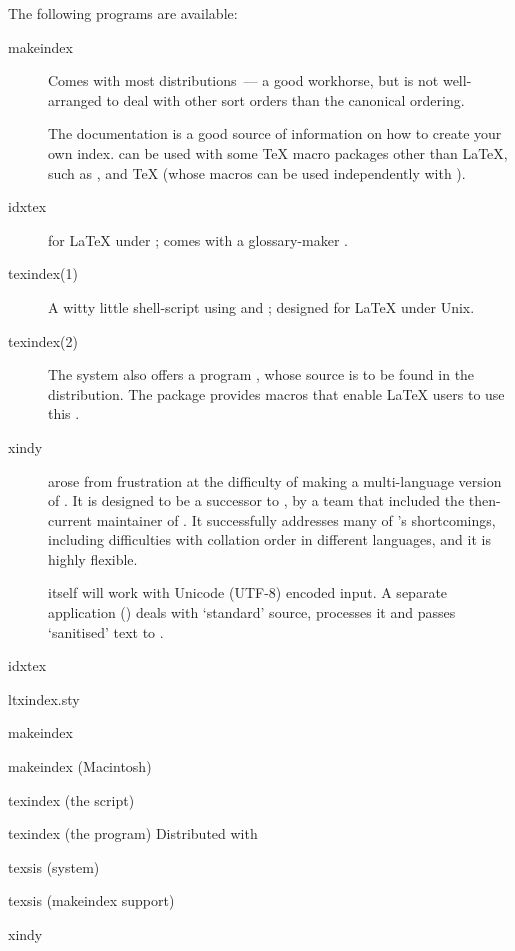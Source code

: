 The following programs are available:
\begin{description}
\item[makeindex] Comes with most distributions~--- a good workhorse,
  but is not well-arranged to deal with other sort orders than the
  canonical  ordering.
  
  The  documentation is a good source of
  information on how to create your own index.  can
  be used with some \TeX{}
  macro packages other than \LaTeX{}, such as \nothtml{\Eplain\ (}%
  \nothtml{)}, and \TeX{} (whose macros can
  be used independently with \plaintex{}).
\item[idxtex] for \LaTeX{} under ;  comes
  with a glossary-maker .
\item[texindex(1)] A witty little shell-script using 
  and ; designed for \LaTeX{} under Unix.
\item[texindex(2)] The  system also offers a program
  , whose source is to be found in the
   distribution.  The  package
  provides macros that enable \LaTeX{} users to use this
  .
\item[xindy] arose from frustration at the difficulty of making a
  multi-language version of .  It is designed to
  be a successor to , by a team that included the
  then-current maintainer of .  It successfully
  addresses many of 's shortcomings, including
  difficulties with collation order in different languages, and it is
  highly flexible.

   itself will work with Unicode (UTF-8) encoded
  \latex{} input.  A separate application () deals
  with `standard' \latex{} source, processes it and passes
  `sanitised' text to .
\end{description}
\begin{ctanrefs}
\item[idxtex]
\item[ltxindex.sty]
\item[makeindex]
\item[makeindex (Macintosh)]
\item[texindex \nothtml{\upshape\rmfamily}(the script)]
\item[texindex \nothtml{\upshape\rmfamily}(the program)]Distributed
  with 
\item[texsis (system)]
\item[texsis (makeindex support)]
\item[xindy]
\end{ctanrefs}

